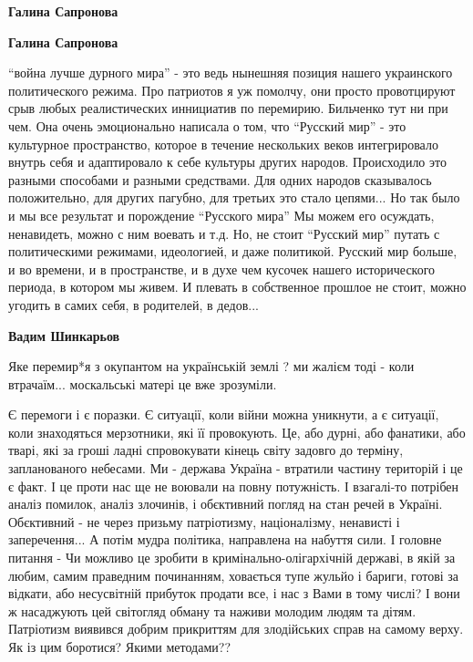 \begin{itemize}
\begin{itemize}
\textbf{Галина Сапронова} 

\textbf{Галина Сапронова} 

\enquote{война лучше дурного мира} - это ведь нынешняя позиция нашего украинского
политического режима. Про патриотов я уж помолчу, они просто провотцируют срыв
любых реалистических иннициатив по перемирию. Бильченко тут ни при чем. Она
очень эмоционально написала о том, что \enquote{Русский мир} - это культурное
пространство, которое в течение нескольких веков интегрировало внутрь себя и
адаптировало к себе культуры других народов. Происходило это разными способами
и разными средствами. Для одних народов сказывалось положительно, для других
пагубно, для третьих это стало цепями... Но так было и мы все результат и
порождение \enquote{Русского мира} Мы можем его осуждать, ненавидеть, можно с ним
воевать и т.д. Но, не стоит \enquote{Русский мир} путать с политическими режимами,
идеологией, и даже политикой. Русский мир больше, и во времени, и в
пространстве, и в духе чем кусочек нашего исторического периода, в котором мы
живем. И плевать в собственное прошлое не стоит, можно угодить в самих себя, в
родителей, в дедов...


\textbf{Вадим Шинкарьов} 

Яке перемир*я з окупантом на українській землі ? ми жалієм тоді - коли
втрачаїм... москальські матері це вже зрозуміли.


Є перемоги і є поразки. Є ситуації, коли війни можна уникнути, а є ситуації,
коли знаходяться мерзотники, які її провокують. Це, або дурні, або фанатики,
або тварі, які за гроші ладні спровокувати кінець світу задовго до терміну,
запланованого небесами. Ми - держава Україна - втратили частину територій і це
є факт. І це проти нас ще не воювали на повну потужність. І взагалі-то потрібен
аналіз помилок, аналіз злочинів, і обєктивний погляд на стан речей в Україні.
Обєктивний - не через призьму патріотизму, націоналізму, ненависті і
заперечення... А потім мудра політика, направлена на набуття сили. І головне
питання - Чи можливо це зробити в кримінально-олігархічній державі, в якій за
любим, самим праведним починанням, ховається тупе жульйо і бариги, готові за
відкати, або несусвітній прибуток продати все, і нас з Вами в тому числі? І
вони ж насаджують цей світогляд обману та наживи молодим людям та дітям.
Патріотизм виявився добрим прикриттям для злодійських справ на самому верху. Як
із цим боротися? Якими методами??


\end{itemize}
\end{itemize}
